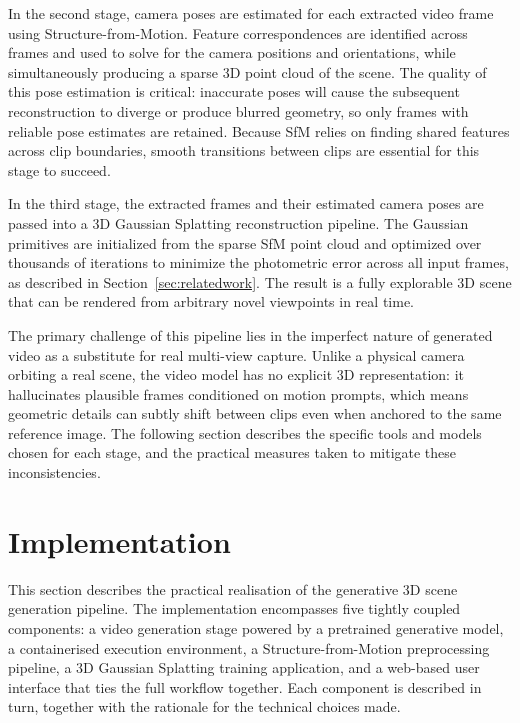 \documentclass[conference]{IEEEtran}
\begin{document}
In the second stage, camera poses are estimated for each extracted video frame using Structure-from-Motion. Feature correspondences are identified across frames and used to solve for the camera positions and orientations, while simultaneously producing a sparse 3D point cloud of the scene. The quality of this pose estimation is critical: inaccurate poses will cause the subsequent reconstruction to diverge or produce blurred geometry, so only frames with reliable pose estimates are retained. Because SfM relies on finding shared features across clip boundaries, smooth transitions between clips are essential for this stage to succeed.

In the third stage, the extracted frames and their estimated camera poses are passed into a 3D Gaussian Splatting reconstruction pipeline. The Gaussian primitives are initialized from the sparse SfM point cloud and optimized over thousands of iterations to minimize the photometric error across all input frames, as described in Section~\ref{sec:relatedwork}. The result is a fully explorable 3D scene that can be rendered from arbitrary novel viewpoints in real time.

The primary challenge of this pipeline lies in the imperfect nature of generated video as a substitute for real multi-view capture. Unlike a physical camera orbiting a real scene, the video model has no explicit 3D representation: it hallucinates plausible frames conditioned on motion prompts, which means geometric details can subtly shift between clips even when anchored to the same reference image. The following section describes the specific tools and models chosen for each stage, and the practical measures taken to mitigate these inconsistencies.

\section{Implementation}
\label{sec:implementation}

This section describes the practical realisation of the generative 3D scene generation pipeline. The implementation encompasses five tightly coupled components: a video generation stage powered by a pretrained generative model, a containerised execution environment, a Structure-from-Motion preprocessing pipeline, a 3D Gaussian Splatting training application, and a web-based user interface that ties the full workflow together. Each component is described in turn, together with the rationale for the technical choices made.
\end{document}
